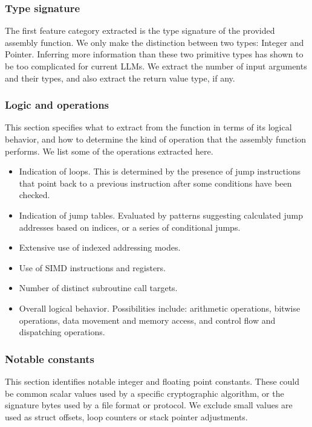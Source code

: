 \documentclass[conference,compsoc]{IEEEtran}
\begin{document}
\subsubsection{Type signature}

The first feature category extracted is the type signature of the provided assembly function.
We only make the distinction between two types: Integer and Pointer. Inferring more information than these two 
primitive types has shown to be too complicated for current LLMs. We extract the number of input arguments
and their types, and also extract the return value type, if any.

\subsubsection{Logic and operations}

This section specifies what to extract from the function in terms of its logical behavior, and how to determine the kind of
operation that the assembly function performs. We list some of the operations extracted here.


\begin{itemize}
\item Indication of loops. This is determined by the presence of jump instructions that point back to a previous
instruction after some conditions have been checked.
\item Indication of jump tables. Evaluated by patterns suggesting calculated jump addresses based on
indices, or a series of conditional jumps.
\item Extensive use of indexed addressing modes.
\item Use of SIMD instructions and registers.
\item Number of distinct subroutine call targets.
\item Overall logical behavior. Possibilities include: arithmetic operations, bitwise operations, data movement and memory access,
and control flow and dispatching operations.
\end{itemize}

\subsubsection{Notable constants}

This section identifies notable integer and floating point constants.  These could be common scalar values used by
a specific cryptographic algorithm, or the signature bytes used by a file format or protocol. We exclude small
values are used as struct offsets, loop counters or stack pointer adjustments.
\end{document}
